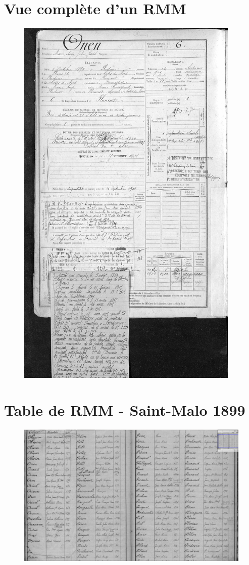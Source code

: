 \documentclass[a4paper]{article}
\begin{document}
\appendix

\section{Vue compl\`ete d'un RMM}
\label{sec:annexe 1}

\begin{figure}[H]
\centering
\includegraphics[width=0.95\textwidth]{RMM.JPG}
\end{figure}

\section{Table de RMM - Saint-Malo 1899}
\label{sec:annexe 2}

\begin{figure}[H]
\centering
\includegraphics[width=\textwidth]{Table_Onen.png}
\end{figure}
\end{document}
